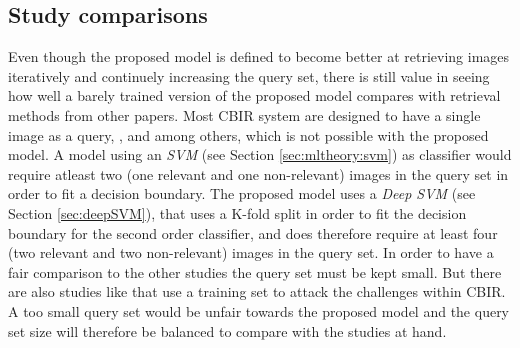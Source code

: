 \subsection{Study comparisons}
\label{sec:meth:eval:studycomp}

Even though the proposed model is defined to become better at retrieving images iteratively and continuely increasing the query set, there is still value in seeing how well a barely trained version of the proposed model compares with retrieval methods from other papers. Most CBIR system are designed to have a single image as a query, \cite{wang2001simplicity}, \cite{subrahmanyam2013modified} and \cite{nagaraja2015low} among others, which is not possible with the proposed model. A model using an \emph{SVM} (see Section \ref{sec:mltheory:svm}) as classifier would require atleast two (one relevant and one non-relevant) images in the query set in order to fit a decision boundary. The proposed model uses a \emph{Deep SVM} (see Section \ref{sec:deepSVM}), that uses a K-fold split in order to fit the decision boundary for the second order classifier, and does therefore require at least four (two relevant and two non-relevant) images in the query set. In order to have a fair comparison to the other studies the query set must be kept small. But there are also studies like \cite{elalami2014new} that use a training set to attack the challenges within CBIR. A too small query set would be unfair towards the proposed model and the query set size will therefore be balanced to compare with the studies at hand.


